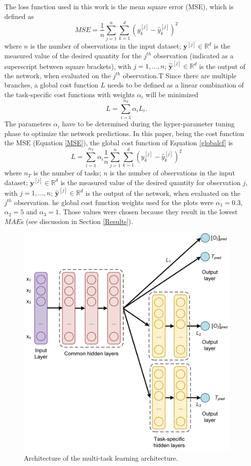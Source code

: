 \documentclass[9pt,twocolumn,twoside,pdftex]{optica}
\begin{document}
The loss function used in this work is the mean square error (MSE), which is defined as
\begin{equation}
MSE = \frac{1}{n}\sum_{j=1}^n \sum_{k=1}^d (y_k^{[j]}-\hat y_k^{[j]})^2
\label{MSE}
\end{equation}
where $n$ is the number of observations in the input dataset; ${\mathbold y}^{[j]} \in \mathbb{R}^d$ is the measured value of the desired quantity for the $j^{th}$ observation (indicated as a superscript between square brackets), with $j=1, ..., n$; $ \hat {\mathbold y}^{[j]} \in \mathbb{R}^d$ is the output of the network, when evaluated on the $j^{th}$ observation.T Since there are multiple branches, a global cost function $L$ needs to be defined as a linear combination of the task-specific cost functions with weights $\alpha_i$ will be minimized
\begin{equation}
L = \sum_{i=1}^{n_T}\alpha_i L_i .
\label{globalcf}
\end{equation}
The parameters $\alpha_i$ have to be determined during the hyper-parameter tuning phase to optimize the network predictions.
In this paper, being the cost function the MSE (Equation \ref{MSE}), the global cost function of Equation \ref{globalcf} is
\begin{equation}
L = \sum_{i=1}^{n_T}\alpha_i \frac{1}{n}\sum_{j=1}^n \sum_{k=1}^d (y_k^{[j]}-\hat y_k^{[j]})^2
\end{equation}
where  $n_T$ is the number of tasks; $n$ is the number of observations in the input dataset; ${\mathbold y}^{[j]} \in \mathbb{R}^d$ is the measured value of the desired quantity for observation $j$, with $j=1, ..., n$; $ \hat {\mathbold y}^{[j]} \in \mathbb{R}^d$ is the output of the network, when evaluated on the $j^{th}$ observation.
he global cost function weights used for the plots were $\alpha_1 = 0.3$, $\alpha_2 = 5$ and $\alpha_3 = 1$. Those values were chosen because they result in the lowest $MAE$s (see discussion in Section \ref{Results}).
 
\begin{figure}[htbp]
\centering
\includegraphics[width=8.7 cm]{NN_MTL_O2_T.png}
\caption{Architecture of the multi-task learning architecture.}
\label{fig:NN_MTL_O2_T}
\end{figure}
\end{document}
